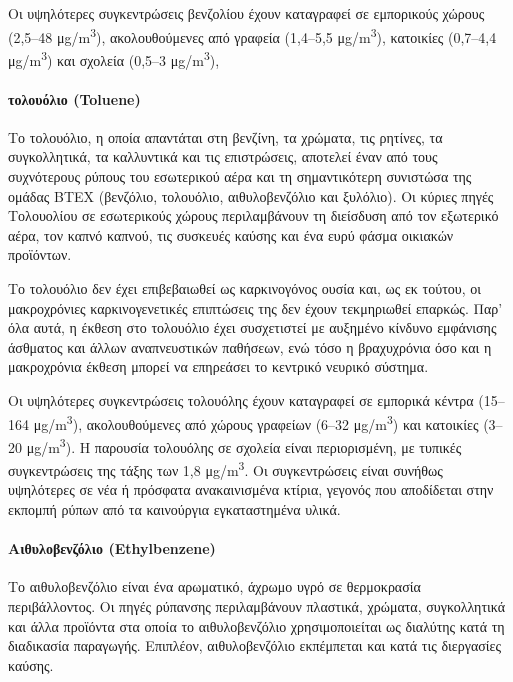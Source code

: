 Οι υψηλότερες συγκεντρώσεις βενζολίου έχουν καταγραφεί σε εμπορικούς χώρους (2,5–48 μg/m\textsuperscript{3}), ακολουθούμενες από γραφεία (1,4–5,5 μg/m\textsuperscript{3}), κατοικίες (0,7–4,4 μg/m\textsuperscript{3}) και σχολεία (0,5–3 μg/m\textsuperscript{3}),

\paragraph{τολουόλιο (Toluene)}

Το τολουόλιο, η οποία απαντάται στη βενζίνη, τα χρώματα, τις ρητίνες, τα συγκολλητικά, τα καλλυντικά και τις επιστρώσεις, αποτελεί έναν από τους συχνότερους ρύπους του εσωτερικού αέρα 
και τη σημαντικότερη συνιστώσα της ομάδας BTEX (βενζόλιο, τολουόλιο, αιθυλοβενζόλιο και ξυλόλιο).
Οι κύριες πηγές Τολουολίου σε εσωτερικούς χώρους περιλαμβάνουν τη διείσδυση από τον εξωτερικό αέρα, τον καπνό καπνού, τις συσκευές καύσης και ένα ευρύ φάσμα οικιακών προϊόντων.

Το τολουόλιο δεν έχει επιβεβαιωθεί ως καρκινογόνος ουσία και, ως εκ τούτου, οι μακροχρόνιες καρκινογενετικές επιπτώσεις της δεν έχουν τεκμηριωθεί επαρκώς.
Παρ’ όλα αυτά, η έκθεση στο τολουόλιο έχει συσχετιστεί με αυξημένο κίνδυνο εμφάνισης άσθματος και άλλων αναπνευστικών παθήσεων, ενώ τόσο η βραχυχρόνια όσο και η μακροχρόνια έκθεση μπορεί να επηρεάσει το κεντρικό νευρικό σύστημα.

Οι υψηλότερες συγκεντρώσεις τολουόλης έχουν καταγραφεί σε εμπορικά κέντρα (15–164 μg/m\textsuperscript{3}), ακολουθούμενες από χώρους γραφείων (6–32 μg/m\textsuperscript{3}) και κατοικίες (3–20 μg/m\textsuperscript{3}).
Η παρουσία τολουόλης σε σχολεία είναι περιορισμένη, με τυπικές συγκεντρώσεις της τάξης των 1,8 μg/m\textsuperscript{3}.
 Οι συγκεντρώσεις είναι συνήθως υψηλότερες σε νέα ή πρόσφατα ανακαινισμένα κτίρια, γεγονός που αποδίδεται στην εκπομπή ρύπων από τα καινούργια εγκαταστημένα υλικά.

\paragraph{Αιθυλοβενζόλιο (Ethylbenzene)}


Το αιθυλοβενζόλιο είναι ένα αρωματικό, άχρωμο υγρό σε θερμοκρασία περιβάλλοντος. Οι πηγές ρύπανσης περιλαμβάνουν πλαστικά, χρώματα, συγκολλητικά και άλλα προϊόντα στα οποία το αιθυλοβενζόλιο χρησιμοποιείται ως διαλύτης κατά τη διαδικασία παραγωγής.
Επιπλέον, αιθυλοβενζόλιο εκπέμπεται και κατά τις διεργασίες καύσης.

